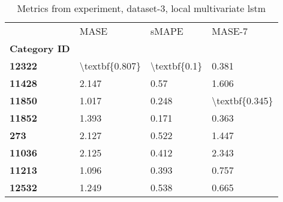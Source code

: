 \begin{table}[h]
\centering
\caption{Metrics from experiment, dataset-3, local multivariate lstm}
\label{table:local-multivariate-lstm-dataset-3}
\begin{tabular}{llll}
\toprule
{} &            MASE &         sMAPE &          MASE-7 \\
\textbf{Category ID} &                 &               &                 \\
\midrule
\textbf{12322      } &  \textbackslash textbf\{0.807\} &  \textbackslash textbf\{0.1\} &           0.381 \\
\textbf{11428      } &           2.147 &          0.57 &           1.606 \\
\textbf{11850      } &           1.017 &         0.248 &  \textbackslash textbf\{0.345\} \\
\textbf{11852      } &           1.393 &         0.171 &           0.363 \\
\textbf{273        } &           2.127 &         0.522 &           1.447 \\
\textbf{11036      } &           2.125 &         0.412 &           2.343 \\
\textbf{11213      } &           1.096 &         0.393 &           0.757 \\
\textbf{12532      } &           1.249 &         0.538 &           0.665 \\
\bottomrule
\end{tabular}
\end{table}
